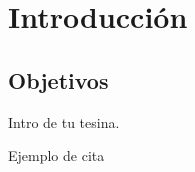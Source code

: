 \chapter{Introducción} \label{cap:intro}

\section{Objetivos} \label{cap:intro:sec:obj}

Intro de tu tesina.

Ejemplo de cita \cite{spatial:book}
